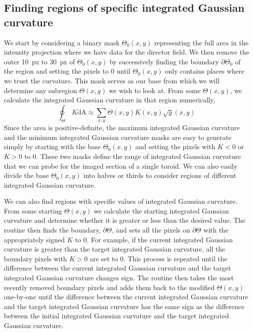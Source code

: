 \subsection{Finding regions of specific integrated Gaussian curvature}
We start by considering a binary mask $\Theta_0(x,y)$ representing the full area in the intensity projection where we have data for the director field.
We then remove the outer 10~px to 30~px of $\Theta_0(x,y)$ by successively finding the boundary $\partial \Theta_0$ of the region and setting the pixels to $0$ until $\Theta_0(x,y)$ only contains places where we trust the curvature.
This mask serves as our base from which we will determine any subregion $\Theta(x,y)$ we wish to look at.
From some $\Theta(x,y)$, we calculate the integrated Gaussian curvature in that region numerically,
\begin{equation}
  \oint_{\Theta}\,K\textrm{dA} \approx \sum\limits_{x,y} \Theta(x,y) K(x,y) \sqrt{g}(x,y)
\end{equation}
Since the area is positive-definite, the maximum integrated Gaussian curvature and the minimum integrated Gaussian curvature masks are easy to generate simply by starting with the base $\Theta_0(x,y)$ and setting the pixels with $K < 0$ or $K > 0$ to $0$.
These two masks define the range of integrated Gaussian curvature that we can probe for the imaged section of a single toroid.
We can also easily divide the base $\Theta_0(x,y)$ into halves or thirds to consider regions of different integrated Gaussian curvature.

We can also find regions with specific values of integrated Gaussian curvature.
From some starting $\Theta(x,y)$ we calculate the starting integrated Gaussian curvature and determine whether it is greater or less than the desired value.
The routine then finds the boundary, $\partial \Theta$, and sets all the pixels on $\partial \Theta$ with the appropriately signed $K$ to $0$.
For example, if the current integrated Gaussian curvature is greater than the target integrated Gaussian curvature, all the boundary pixels with $K > 0$ are set to $0$.
This process is repeated until the difference between the current integrated Gaussian curvature and the target integrated Gaussian curvature changes sign.
The routine then takes the most recently removed boundary pixels and adds them back to the modified $\Theta(x,y)$ one-by-one until the difference between the current integrated Gaussian curvature and the target integrated Gaussian curvature has the same sign as the difference between the initial integrated Gaussian curvature and the target integrated Gaussian curvature.


